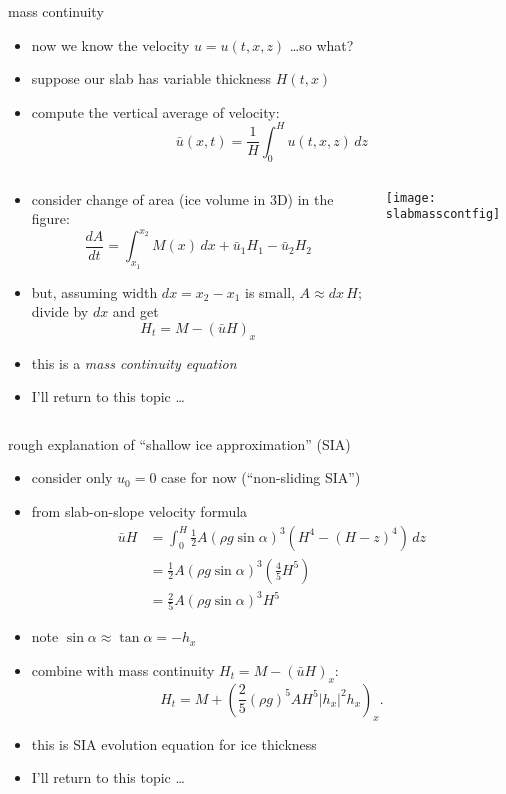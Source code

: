\begin{frame}{mass continuity}

\small
\begin{itemize}
\item now we know the velocity $u=u(t,x,z)$ \dots so what?
\item suppose our slab has variable thickness $H(t,x)$
\item compute the vertical average of velocity:
	$$\bar u(x,t) = \frac{1}{H}\int_0^{H} u(t,x,z)\,dz$$
\end{itemize}

\begin{columns}
\begin{column}{0.6\textwidth}
\begin{itemize}
\item consider change of area (ice volume in 3D) in the figure:
	$$\frac{dA}{dt} = \int_{x_1}^{x_2} M(x)\,dx + \bar u_1 H_1 - \bar u_2 H_2$$
\item but, assuming width $dx=x_2-x_1$ is small, $A\approx dx\, H$; divide by $dx$ and get
   $$H_t = M - \left(\bar u H\right)_x$$
\item this is a \emph{mass continuity equation}
\item I'll return to this topic \dots
\end{itemize}
\end{column}
\begin{column}{0.4\textwidth}
\texttt{[image: slabmasscontfig]}
\end{column}
\end{columns}
\end{frame}


\begin{frame}{rough explanation of ``shallow ice approximation'' (SIA)}

\small
\begin{itemize}
\item consider only $u_0=0$ case for now (``non-sliding SIA'')
\item from slab-on-slope velocity formula
\begin{align*}
\bar u H &= \int_0^H \frac{1}{2} A (\rho g \sin\alpha)^3  \left(H^4 - (H-z)^4\right)\,dz \\
	&= \frac{1}{2} A (\rho g \sin\alpha)^3  \left(\frac{4}{5} H^5\right) \\
	&= \frac{2}{5} A (\rho g \sin\alpha)^3 H^5
\end{align*}
\item note $\sin \alpha \approx \tan\alpha = - h_x$
\item combine with mass continuity $H_t = M - \left(\bar u H\right)_x$:
  $$H_t = M + \left(\frac{2}{5} (\rho g)^5 A H^5 |h_x|^2 h_x\right)_x.$$
\item this is SIA evolution equation for ice thickness
\item I'll return to this topic \dots
\end{itemize}
\end{frame}